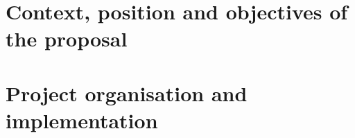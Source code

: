 \documentclass[a4paper,11pt]{article}
\author{Coordinateur: Mathieu Leocmach\\
\small Univ Lyon, Université Claude Bernard Lyon 1, CNRS, Institut Lumière Matière
}
\title{\vspace{-\baselineskip}\mytitle}
\date{}
\begin{document}
\maketitle
\thispagestyle{fancy}
\section{Context, position and objectives of the proposal}

\section{Project organisation and implementation}

%
\end{document}
